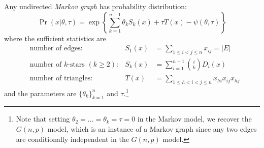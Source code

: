 \begin{example}
\label{ex:markov_graphs}
Any undirected \emph{Markov graph} has probability distribution:
\begin{equation*}
\label{eqn:markov_graph}
\Pr(x | \theta, \tau) = \exp\left\{ \sum_{k = 1}^{n-1} \theta_k S_k(x) + \tau T(x) - \psi(\theta, \tau)   \right\} 
\end{equation*}
where the sufficient statistics are
\begin{align*}
&\text{number of edges:} & S_1(x)  & = \sum_{1 \leq i < j \leq n} x_{ij} = |E|\\
&\text{number of $k$-stars } (k \geq 2): & S_k(x)  & = \sum_{i=1}^{n-1} \binom{i}{k} D_i(x)\\
&\text{number of triangles: } & T(x) & = \sum_{1 \leq h < i < j \leq n} x_{hi} x_{ij} x_{hj}
\end{align*}
and the parameters are $\{\theta_k\}_{k=1}^{n}$ and $\tau$.\footnote{Note that setting $\theta_2 = ...= \theta_k = \tau = 0$ in the Markov model, we recover the $G(n,p)$ model, which is an instance of a Markov graph since any two edges are conditionally independent in the $G(n,p)$ model.}
\end{example}




